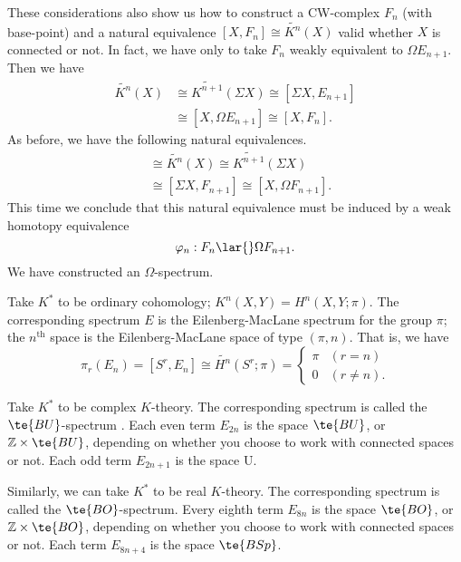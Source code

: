 \documentclass[../main]{subfiles}
\begin{document}
These considerations also show us how to construct a CW-complex $F_n$ (with base-point) and a natural equivalence $[X,F_n] \cong \widetilde{K^n}(X)$ valid whether $X$ is connected or not. In fact, we have only to take $F_n$ weakly equivalent to $\Omega E_{n+1}$. Then we have
    \begin{align*}
    \widetilde{K^n}(X)
    &\cong
    \widetilde{K^{n+1}}(\Sigma   X)
        \cong [\Sigma   X, E_{n+1}]
        \\
    &\cong
    [X, \Omega E_{n+1}]
        \cong [X, F_n].
    \end{align*}
As before, we have the following natural equivalences.
    \begin{align*}
    [X,F_n]
    &\cong
    \widetilde{K^n}(X)
        \cong \widetilde{K^{n+1}}(\Sigma   X)
        \\
    &\cong
    [\Sigma   X, F_{n+1}]
        \cong [X, \Omega F_{n+1}]. %
    \end{align*}
This time we conclude that this natural equivalence must be induced by a weak homotopy equivalence
\[
\varphi_n: F_n \lar{} \Omega F_{n+1}.
\]
We have constructed an $\Omega$-spectrum.

\begin{example} \label{ex:p3ch02.1}
Take $K^\ast$ to be ordinary cohomology; $K^n(X,Y)=H^n(X,Y;\pi)$. The corresponding spectrum $E$ is the Eilenberg-MacLane spectrum for the group $\pi$; the $n^{\text{th}}$ space is the Eilenberg-MacLane space  of type $(\pi,n)$. That is, we have
\[
\pi_r(E_n)
=
[S^r,E_n]
\cong
\widetilde{H^n}(S^r;\pi)
=
\begin{cases}
\pi &(r=n) \\
  0 &(r\neq n).
\end{cases}
\]
\end{example}

\begin{example} \label{ex:p3ch02.2}
Take $K^\ast$ to be complex $K$-theory. The corresponding spectrum is called the $\te{BU}$-spectrum . Each even term $E_{2n}$ is the space $\te{BU}$, or $\mathbb Z \times \te{BU}$, depending on whether you choose to work with connected spaces or not. Each odd term $E_{2n+1}$ is the space U.

Similarly, we can take $K^\ast$ to be real $K$-theory. The corresponding spectrum is called the $\te{BO}$-spectrum. Every eighth term $E_{8n}$ is the space $\te{BO}$, or $\mathbb Z \times \te{BO}$, depending on whether you choose to work with connected spaces or not. Each term $E_{8n+4}$ is the space $\te{BSp}$.
\end{example}
\end{document}

